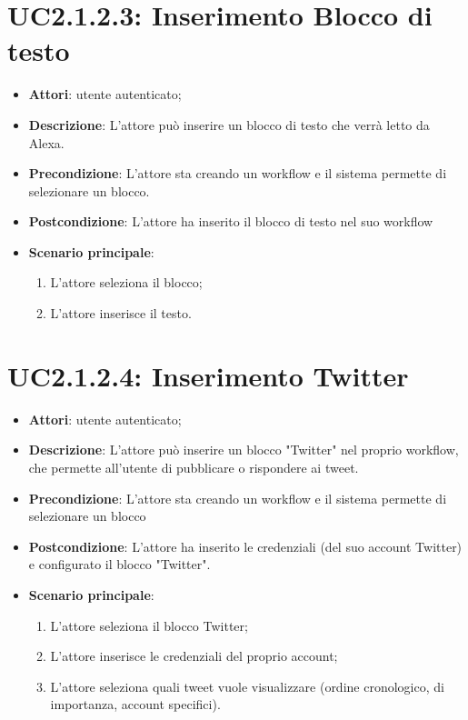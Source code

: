 \section{UC2.1.2.3: Inserimento Blocco di testo}
\label{UC2.1.2.3}
\begin{itemize}
	\item \textbf{Attori}: utente autenticato;
	\item \textbf{Descrizione}: L'attore può inserire un blocco di testo che verrà letto da Alexa.
	\item \textbf{Precondizione}: L'attore sta creando un workflow e il sistema permette di selezionare un blocco.
	\item \textbf{Postcondizione}: L'attore ha inserito il blocco di testo nel suo workflow
	\item \textbf{Scenario principale}:
	\begin{enumerate} \item L'attore seleziona il blocco;  \item  L'attore inserisce il testo.\end{enumerate}
\end{itemize}

\section{UC2.1.2.4: Inserimento Twitter}
\label{UC2.1.2.4}
\begin{itemize}
	\item \textbf{Attori}: utente autenticato;
	\item \textbf{Descrizione}: L'attore può inserire un blocco "Twitter" nel proprio workflow, che permette all'utente di pubblicare o rispondere ai tweet.
	\item \textbf{Precondizione}: L'attore sta creando un workflow e il sistema permette di selezionare un blocco
	\item \textbf{Postcondizione}: L'attore ha inserito le credenziali (del suo account Twitter) e configurato il blocco "Twitter".
	\item \textbf{Scenario principale}:
	\begin{enumerate} \item L'attore seleziona il blocco Twitter;  \item  L'attore inserisce le credenziali del proprio account;  \item  L'attore seleziona quali tweet vuole visualizzare (ordine cronologico, di importanza, account specifici).\end{enumerate}
\end{itemize}

